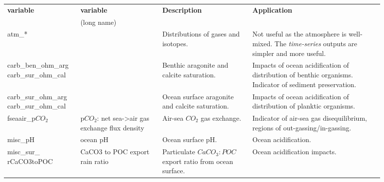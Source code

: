 \documentclass[11pt,fleqn]{book} %
\begin{document}
\begin{table}[ht]
\begin{tabular}{p{0.15\linewidth} p{0.20\linewidth} p{0.225\linewidth} p{0.325\linewidth}}
\toprule
\textbf{variable} & \textbf{variable} & \textbf{Description} & \textbf{Application}\\
 & (long name) & &\\
\midrule

\textsf{\footnotesize atm\_*} & \textsf{\footnotesize } & \small{Distributions of gases and isotopes.} & \small{Not useful as the atmosphere is well-mixed. The \textit{time-series} outputs are simpler and more useful.}\\

\midrule

\textsf{\footnotesize carb\_ben\_ohm\_arg} \textsf{\footnotesize carb\_sur\_ohm\_cal} & \textsf{\footnotesize } & \small{Benthic aragonite and calcite saturation.} & Impacts of ocean acidification of distribution of benthic organisms. Indicator of sediment preservation.\\
\textsf{\footnotesize carb\_sur\_ohm\_arg} \textsf{\footnotesize carb\_sur\_ohm\_cal} & \textsf{\footnotesize } & \small{Ocean surface aragonite and calcite saturation.} & Impacts of ocean acidification of distribution of planktic organisms.\\

\midrule

\textsf{\footnotesize fseaair\_p\(CO_{2}\)} & \textsf{\footnotesize p\(CO_{2}\): net sea->air gas exchange flux density} & \small{Air-sea \(CO_{2}\) gas exchange.} & \small{Indicator of air-sea gas disequilibrium, regions of out-gassing/in-gassing.}\\

\midrule

\textsf{\footnotesize misc\_pH} & \textsf{\footnotesize ocean pH} & \small{Ocean surface pH.} & \small{Ocean acidification.}\\
\textsf{\footnotesize misc\_sur\_} \textsf{\footnotesize rCaCO3toPOC} & \textsf{\footnotesize CaCO3 to POC export rain ratio} & \small{Particulate \(CaCO_{3}:POC\) export ratio from ocean surface.} & \small{Ocean acidification impacts.}\\

\midrule


\end{tabular}
\end{table}
\end{document}
